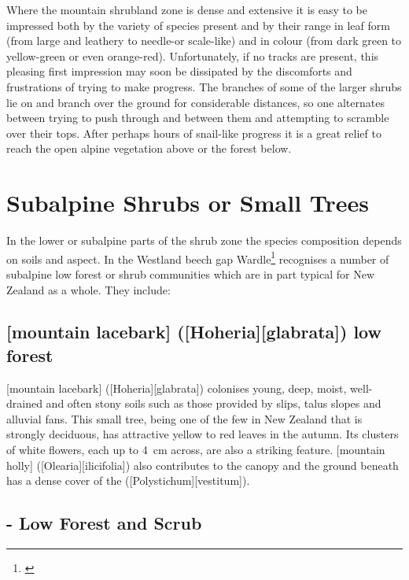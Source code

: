 Where the mountain shrubland zone is dense and extensive it is easy to be impressed both by the variety of species present and by their range in leaf form (from large and leathery to needle-or scale-like) and in colour (from dark green to yellow-green or even orange-red).
Unfortunately, if no tracks are present, this pleasing first impression may soon be dissipated by the discomforts and frustrations of trying to make progress.
The branches of some of the larger shrubs lie on and branch over the ground for considerable distances, so one alternates between trying to push through and between them and attempting to scramble over their tops.
After perhaps hours of snail-like progress it is a great relief to reach the open alpine vegetation above or the forest below.

\section{Subalpine Shrubs or Small Trees}

In the lower or subalpine parts of the shrub zone the species composition depends on soils and aspect.
In the Westland beech gap Wardle\footnote{\cite{wardle1977plant}} recognises a number of subalpine low forest or shrub communities which are in part typical for New Zealand as a whole.
They include:

\subsection[Mountain Lacebark (\emph{Hoheria glabrata}) low forest]{[mountain lacebark] ([Hoheria][glabrata]) low forest}

[mountain lacebark] ([Hoheria][glabrata]) colonises young, deep, moist, well-drained and often stony soils such as those provided by slips, talus slopes and alluvial fans.
This small tree, being one of the few in New Zealand that is strongly deciduous, has attractive yellow to red leaves in the autumn.
Its clusters of white flowers, each up to \SI{4}{\centi\metre} across, are also a striking feature. [mountain holly] ([Olearia][ilicifolia]) also contributes to the canopy and the ground beneath has a dense cover of the  ([Polystichum][vestitum]).

\subsection[\emph{Dracophyllum}-\emph{Olearia} Low Forest and Scrub]{- Low Forest and Scrub}

